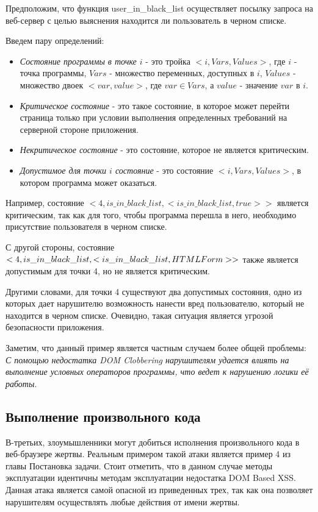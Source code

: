 Предположим, что функция user\_in\_black\_list осуществляет посылку запроса на веб-сервер с целью выяснения находится ли пользователь в черном списке.


Введем пару определений:
\begin{itemize}
	\item \textit{Состояние программы в точке $i$} - это тройка $<i, Vars, Values>$, где $i$ - точка программы, $Vars$ - множество переменных, доступных в $i$, $Values$ - множество двоек $<var, value>$, где $var \in Vars$, а $value$ - значение $var$ в $i$.  
	\item \textit{Критическое состояние} - это такое состояние, в которое может перейти страница только при условии выполнения определенных требований на серверной стороне приложения.
	\item \textit{Некритическое состояние} - это состояние, которое не является критическим.
	\item \textit{Допустимое для точки $i$ состояние} - это состояние $<i, Vars, Values>$, в котором программа может оказаться.
\end{itemize}


Например, состояние $<4, is\_in\_black\_list , <is\_in\_black\_list, true>>$ является критическим, так как для того, чтобы программа перешла в него, необходимо присутствие пользователя в черном списке.

\bigskip
С другой стороны, состояние $<4, is\_in\_black\_list, <is\_in\_black\_list, \\HTMLForm>>$  также является допустимым для точки 4, но не является критическим.
\bigskip

Другими словами, для точки 4 существуют два допустимых состояния, одно из которых дает нарушителю возможность нанести вред пользователю, который не находится в черном списке. Очевидно, такая ситуация является угрозой безопасности приложения.


Заметим, что данный пример является частным случаем более общей проблемы: \textit{С помощью недостатка DOM Clobbering нарушителям удается влиять на выполнение условных операторов программы, что ведет к нарушению логики её работы}.

\subsection{Выполнение произвольного кода}
В-третьих, злоумышленники могут добиться исполнения произвольного кода в веб-браузере жертвы. Реальным примером такой атаки является пример 4 из главы Постановка задачи. Стоит отметить, что в данном случае методы эксплуатации идентичны методам эксплуатации недостатка DOM Based XSS. Данная атака является самой опасной из приведенных трех, так как она позволяет нарушителям осуществлять любые действия от имени жертвы.

